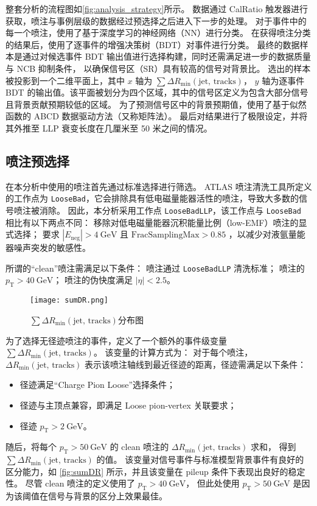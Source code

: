 整套分析的流程图如\autoref{fig:analysis_strategy}所示。
数据通过 CalRatio 触发器进行获取，喷注与事例层级的数据经过预选择之后进入下一步的处理。
对于事件中的每一个喷注，使用了基于深度学习的神经网络（NN）进行分类。
在获得喷注分类的结果后，使用了逐事件的增强决策树（BDT）对事件进行分类。
最终的数据样本是通过对候选事件 BDT 输出值进行选择构建，同时还需满足进一步的数据质量与 NCB 抑制条件，
以确保信号区（SR）具有较高的信号对背景比。
选出的样本被投影到一个二维平面上，其中 $x$ 轴为 $\sum \Delta R_{\min}(\text{jet, tracks})$，
$y$ 轴为逐事件 BDT 的输出值。该平面被划分为四个区域，其中的信号区定义为包含大部分信号且背景贡献预期较低的区域。
为了预测信号区中的背景预期值，使用了基于似然函数的 ABCD 数据驱动方法（又称矩阵法）。
最后对结果进行了极限设定，并将其外推至 LLP 衰变长度在几厘米至 50 米之间的情况。


\subsection{喷注预选择}
在本分析中使用的喷注首先通过标准选择进行筛选。
ATLAS 喷注清洗工具所定义的工作点为 \texttt{LooseBad}，它会排除具有低电磁量能器活性的喷注，导致大多数的信号喷注被消除。
因此，本分析采用工作点 \texttt{LooseBadLLP}，该工作点与 \texttt{LooseBad} 相比有以下两点不同：
移除对低电磁量能器沉积能量比例（low-EMF）喷注的显式选择；
要求 \(|E_{\text{neg}}| > 4~\text{GeV}\) 且 \(\text{FracSamplingMax} > 0.85\) ，以减少对液氩量能器噪声突发的敏感性。

所谓的“clean”喷注需满足以下条件：
喷注通过 \texttt{LooseBadLLP} 清洗标准；
喷注的 \(p_{\mathrm{T}} > 40~\text{GeV}\)；
喷注的伪快度满足 \(|\eta| < 2.5\)。

\begin{figure}[ht]
    \centering
    \texttt{[image: sumDR.png]}
    \caption{$\sum \Delta R_{\text{min}}(\text{jet, tracks})$分布图}
    \label{fig:sumDR}
\end{figure}

为了选择无径迹喷注的事件，定义了一个额外的事件级变量 $\sum \Delta R_{\text{min}}(\text{jet, tracks})$。
该变量的计算方式为：
对于每个喷注，\(\Delta R_{\text{min}}(\text{jet, tracks})\) 表示该喷注轴线到最近径迹的距离，径迹需满足以下条件：
\begin{itemize}
    \item 径迹满足“Charge Pion Loose”选择条件；
    \item 径迹与主顶点兼容，即满足 Loose pion-vertex 关联要求；
    \item 径迹 \(p_{\mathrm{T}} > 2~\text{GeV}\)。
\end{itemize}
随后，将每个 \(p_{\mathrm{T}} > 50~\text{GeV}\) 的 clean 喷注的 \(\Delta R_{\text{min}}(\text{jet, tracks})\) 求和，
得到 \(\sum \Delta R_{\text{min}}(\text{jet, tracks})\) 的值。
该变量对信号事件与标准模型背景事件有良好的区分能力，如 \autoref{fig:sumDR} 所示，并且该变量在 pileup 条件下表现出良好的稳定性。
尽管 clean 喷注的定义使用了 \(p_{\mathrm{T}} > 40~\text{GeV}\)，
但此处使用 \(p_{\mathrm{T}} > 50~\text{GeV}\) 是因为该阈值在信号与背景的区分上效果最佳。

